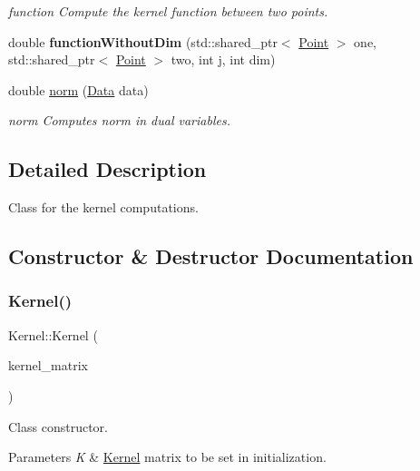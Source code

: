 \begin{DoxyCompactItemize}
\begin{DoxyCompactList}\small\item\em function Compute the kernel function between two points. \end{DoxyCompactList}\item 
\mbox{\label{class_kernel_a6bc15688392e214705c7217e5a6a1411}} 
double {\bfseries function\+Without\+Dim} (std\+::shared\+\_\+ptr$<$ \hyperlink{class_point}{Point} $>$ one, std\+::shared\+\_\+ptr$<$ \hyperlink{class_point}{Point} $>$ two, int j, int dim)
\item 
double \hyperlink{class_kernel_a1f548d2e5477ae0ee3dd3bc7f23e6920}{norm} (\hyperlink{class_data}{Data} data)
\begin{DoxyCompactList}\small\item\em norm Computes norm in dual variables. \end{DoxyCompactList}\end{DoxyCompactItemize}


\subsection{Detailed Description}
Class for the kernel computations. 

\subsection{Constructor \& Destructor Documentation}
\mbox{\label{class_kernel_adf23c1567adb8ddb5757931587320871}} 
\subsubsection{\texorpdfstring{Kernel()}{Kernel()}}
{\footnotesize\ttfamily Kernel\+::\+Kernel (\begin{DoxyParamCaption}\item[{d\+Matrix}]{kernel\+\_\+matrix }\end{DoxyParamCaption})}



Class constructor. 


\begin{DoxyParams}{Parameters}
{\em K} & \hyperlink{class_kernel}{Kernel} matrix to be set in initialization. \\
\hline
\end{DoxyParams}


